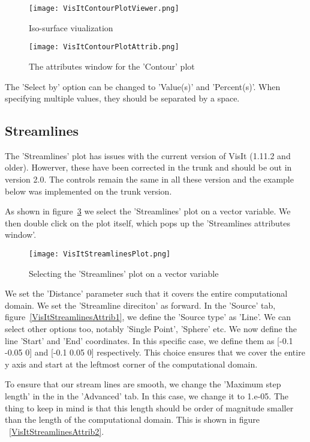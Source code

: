\begin{figure}
  \center
  \texttt{[image: VisItContourPlotViewer.png]}
  \caption{Iso-surface viualization}
  \label{VisItContourPlotViewer}
\end{figure}

\begin{figure}
  \center
  \texttt{[image: VisItContourPlotAttrib.png]}
  \caption{The attributes window for the 'Contour' plot}
  \label{VisItContourPlotAttrib}
\end{figure}

The 'Select by' option can be changed to 'Value(s)' and 'Percent(s)'. When specifying multiple values, they should be separated by a space.

\subsection{Streamlines}

The 'Streamlines' plot has issues with the current version of VisIt (1.11.2 and older). Howerver, these have been corrected in the trunk and should be out in version 2.0. The controls remain the same in all these version and the example below was implemented on the trunk version.

As shown in figure~\ref{VisItStreamlinesPlot} we select the 'Streamlines' plot on a vector variable. We then double click on the plot itself, which pops up the 'Streamlines attributes window'. 

\begin{figure}
  \center
  \texttt{[image: VisItStreamlinesPlot.png]}
  \caption{Selecting the 'Streamlines' plot on a vector variable}
  \label{VisItStreamlinesPlot}
\end{figure}

We set the 'Distance' parameter such that it covers the entire computational domain. We set the  'Streamline direciton' as forward. In the 'Source' tab, figure~\ref{VisItStreamlinesAttrib1}, we define the 'Source type' as 'Line'. We can select other options too, notably 'Single Point', 'Sphere' etc. We now define the line 'Start' and 'End' coordinates. In this specific case, we define them as [-0.1 -0.05 0] and [-0.1 0.05 0] respectively. This choice ensures that we cover the entire y axis and start at the leftmost corner of the computational domain.

To ensure that our stream lines are smooth, we change the 'Maximum step length' in the in the 'Advanced' tab. In this case, we change it to 1.e-05. The thing to keep in mind is that this length should be order of magnitude smaller than the length of the computational domain. This is shown in figure ~\ref{VisItStreamlinesAttrib2}.

